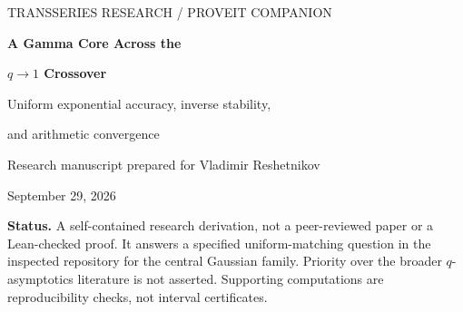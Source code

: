 \documentclass[11pt,a4paper]{article}
\numberwithin{equation}{section}
\theoremstyle{definition}
\begin{document}
\hypersetup{pageanchor=false}
\begin{titlepage}
\vspace*{12mm}
{\color{MidnightBlue}\large TRANSSERIES RESEARCH / PROVEIT COMPANION\par}
\vspace{13mm}
{\LARGE\bfseries A Gamma Core Across the\par}
\vspace{2mm}
{\LARGE\bfseries $q\to1$ Crossover\par}
\vspace{8mm}
{\Large Uniform exponential accuracy, inverse stability,\par
and arithmetic convergence\par}
\vspace{14mm}
{\large Research manuscript prepared for Vladimir Reshetnikov\par}
\vspace{3mm}
{September 29, 2026\par}
\vspace{13mm}
\begin{abstract}
The central Gaussian-binomial interpolation has a dilogarithmic expansion in the double-scaling variable $\tau=x\log q$, but its usual coefficients become singular as $\tau\to0$. We retain the classical Gamma quotient exactly and derive a regularized expansion with an explicit Euler--Maclaurin remainder valid simultaneously for every real $x\ge0$. Optimally truncating this expansion gives a uniform logarithmic error at most $(8+o(1))\exp(-4\pi^2/\log q)$. The exponential action is sharp for this truncation scheme: the error at the far end of the index range tends to an exact modular Euler-product contribution. A derivative-sensitive argument transports the same exponential action through inversion, uniformly over all nonnegative logarithmic targets, including the quadratic endpoint where the forward derivative vanishes.

A complementary fixed-index analysis gives a precise arithmetic distinction. The formal expansion in $\log q$ has positive convergence radius exactly when twice the index is an integer. At nonintegral half-integers the convergent series nevertheless misses a nonzero flat term, identical on every such half-integer sheet. Its exact value is a simple combination of two modular Euler products. The proofs, computational audits, qualifications on novelty, and further research questions are included.
\end{abstract}
\vfill
\noindent\small\textbf{Status.} A self-contained research derivation, not a peer-reviewed paper or a Lean-checked proof. It answers a specified uniform-matching question in the inspected repository for the central Gaussian family. Priority over the broader $q$-asymptotics literature is not asserted. Supporting computations are reproducibility checks, not interval certificates.
\end{titlepage}
\hypersetup{pageanchor=true}
\end{document}
